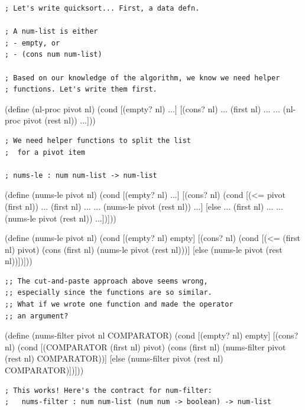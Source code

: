 \documentclass{article}
\begin{document}
\begin{verbatim}
; Let's write quicksort... First, a data defn.

; A num-list is either
; - empty, or
; - (cons num num-list)

; Based on our knowledge of the algorithm, we know we need helper
; functions. Let's write them first.
\end{verbatim}

\begin{schemedisplay}
(define (nl-proc pivot nl)
  (cond
    [(empty? nl) ...]
    [(cons? nl)
     ... (first nl) ...
     ... (nl-proc pivot (rest nl)) ...]))
\end{schemedisplay}

\begin{verbatim}
; We need helper functions to split the list
;  for a pivot item

; nums-le : num num-list -> num-list
\end{verbatim}

\begin{schemedisplay}
(define (nums-le pivot nl)
  (cond
    [(empty? nl) ...]
    [(cons? nl)
     (cond
       [(<= pivot (first nl))
        ... (first nl) ...
        ... (nums-le pivot (rest nl)) ...]
       [else
        ... (first nl) ...
        ... (nums-le pivot (rest nl)) ...])]))

(define (nums-le pivot nl)
  (cond
    [(empty? nl) empty]
    [(cons? nl)
     (cond
       [(<= (first nl) pivot)
        (cons (first nl) (nums-le pivot (rest nl)))]
       [else
        (nums-le pivot (rest nl))])]))
\end{schemedisplay}

\begin{verbatim}
;; The cut-and-paste approach above seems wrong,
;; especially since the functions are so similar.
;; What if we wrote one function and made the operator
;; an argument?
\end{verbatim}

\newpage

\begin{schemedisplay}
(define (nums-filter pivot nl COMPARATOR)
  (cond
    [(empty? nl) empty]
    [(cons? nl)
     (cond
       [(COMPARATOR (first nl) pivot)
        (cons (first nl) (nums-filter pivot (rest nl) COMPARATOR))]
       [else
        (nums-filter pivot (rest nl) COMPARATOR)])]))
\end{schemedisplay}

\begin{verbatim}
; This works! Here's the contract for num-filter:
;   nums-filter : num num-list (num num -> boolean) -> num-list
\end{verbatim}
\end{document}
